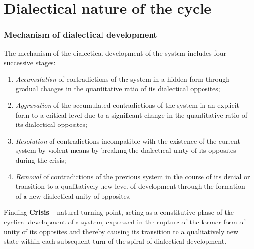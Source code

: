 \section{Dialectical nature of the cycle}

\begin{frame}
  \frametitle{Mechanism of dialectical development}
  The mechanism of the dialectical development of the system includes four successive stages:
  \begin{enumerate}
    \item \textit{Accumulation} of contradictions of the system in a hidden form through gradual changes in the quantitative ratio of its dialectical opposites;
    \item \textit{Aggravation} of the accumulated contradictions of the system in an explicit form to a critical level due to a significant change in the quantitative ratio of its dialectical opposites;
    \item \textit{Resolution} of contradictions incompatible with the existence of the current system by violent means by breaking the dialectical unity of its opposites during the crisis;
    \item \textit{Removal} of contradictions of the previous system in the course of its denial or transition to a qualitatively new level of development through the formation of a new dialectical unity of opposites.
  \end{enumerate}

  \begin{alertblock}{Finding}
    \textbf{Crisis} – natural turning point, acting as a constitutive phase of the cyclical development of a system, expressed in the rupture of the former form of unity of its opposites and thereby causing its transition to a qualitatively new state within each subsequent turn of the spiral of dialectical development.
  \end{alertblock}
\end{frame}

